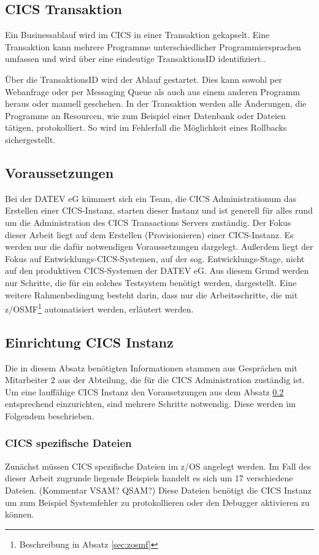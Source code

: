 \subsection{CICS Transaktion}\label{subsec:trans}
Ein Businessablauf wird im CICS in einer Transaktion gekapselt.
Eine Transaktion kann mehrere Programme unterschiedlicher Programmiersprachen umfassen und wird über eine eindeutige \glqq TransaktionsID\grqq{} identifiziert..

Über die TransaktionsID wird der Ablauf gestartet.
Dies kann sowohl per Webanfrage oder per Messaging Queue als auch aus einem anderen Programm heraus oder manuell geschehen.
In der Transaktion werden alle Änderungen, die Programme an Resourcen, wie zum Beispiel einer Datenbank oder Dateien tätigen, protokolliert.
So wird im Fehlerfall die Möglichkeit eines Rollbacks sichergestellt.
 \cite{Rayns.2011}

\subsection{Voraussetzungen}\label{subsec:voraus}
Bei der DATEV eG kümmert sich ein Team, die \glqq CICS Administration\grqq{}um das Erstellen einer CICS-Instanz, starten dieser Instanz und ist generell für alles rund um die Administration des CICS Transactions Servers zuständig.
Der Fokus dieser Arbeit liegt auf dem Erstellen (\glqq Provisionieren\grqq{}) einer CICS-Instanz. Es werden nur die dafür notwendigen Voraussetzungen dargelegt.
Außerdem liegt der Fokus auf Entwicklungs-CICS-Systemen, auf der sog. Entwicklungs-Stage, nicht auf den produktiven CICS-Systemen der DATEV eG. 
Aus diesem Grund werden nur Schritte, die für ein solches Testsystem benötigt werden, dargestellt.
Eine weitere Rahmenbedingung besteht darin, dass nur die Arbeitsschritte, die mit z/OSMF\footnote{Beschreibung in Absatz \ref{sec:zosmf}} automatisiert werden, erläutert werden.

\subsection{Einrichtung CICS Instanz}\label{subsec:createCICS}
Die in diesem Absatz benötigten Informationen stammen aus Gesprächen mit Mitarbeiter 2 aus der Abteilung, die für die CICS Administration zuständig ist.
Um eine lauffähige CICS Instanz den Vorausetzungen aus dem Absatz \ref{subsec:voraus} entsprechend einzurichten, sind mehrere Schritte notwendig.
Diese werden im Folgendem beschrieben.

\subsubsection{CICS spezifische Dateien}\label{sssec:speziDat}
Zunächst müssen CICS spezifische Dateien im z/OS angelegt werden.
Im Fall des dieser Arbeit zugrunde liegende Beispiels handelt es sich um 17 verschiedene Dateien. (Kommentar VSAM? QSAM?)
Diese Dateien benötigt die CICS Instanz um zum Beispiel Systemfehler zu protokollieren oder den Debugger aktivieren zu können.


